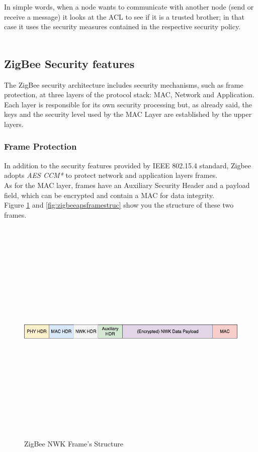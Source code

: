\documentclass[12pt]{report}
\begin{document}
{In simple words, when a node wants to communicate with another node (send or receive a message) it looks at the ACL to see if it is a trusted brother; in that case it uses the security measures contained in the respective security policy.\\\\

\subsection{ZigBee Security features}
\label{ssec:zigbeesecfeatures}
\bigskip
The ZigBee security architecture includes security mechanisms, such as frame protection, at three layers of the protocol stack: MAC, Network and Application.\\
Each layer is responsible for its own security processing but, as already said, the keys and the security level used by the MAC Layer are established by the upper layers.

\subsubsection{Frame Protection}
\bigskip
In addition to the security features provided by IEEE 802.15.4 standard, Zigbee adopts \emph{AES CCM*} to protect network and application layers frames.\\
As for the MAC layer, frames have an Auxiliary Security Header and a payload field, which can be encrypted and contain a MAC for data integrity.\\
Figure \ref{fig:zigbeenwkframestruc} and \ref{fig:zigbeeapsframestruc} show you the structure of these two frames.\\

\begin{figure}[H]
\includegraphics[width=13cm,height=11cm,keepaspectratio]{nwk_frame}
\centering
\caption{ZigBee NWK Frame's Structure}
\label{fig:zigbeenwkframestruc}
\end{figure}

}
\end{document}
